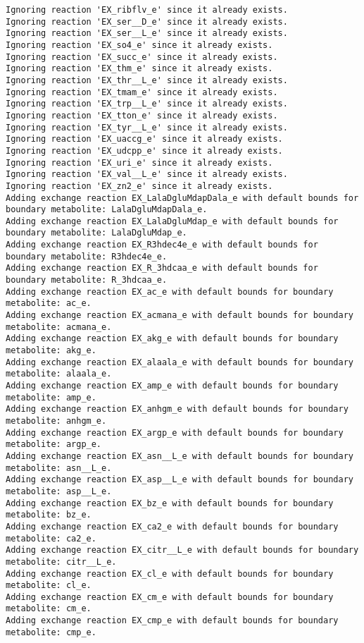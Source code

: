 \documentclass[
  letterpaper,
  DIV=11,
  numbers=noendperiod]{scrartcl}
\begin{document}
\begin{verbatim}
Ignoring reaction 'EX_ribflv_e' since it already exists.
Ignoring reaction 'EX_ser__D_e' since it already exists.
Ignoring reaction 'EX_ser__L_e' since it already exists.
Ignoring reaction 'EX_so4_e' since it already exists.
Ignoring reaction 'EX_succ_e' since it already exists.
Ignoring reaction 'EX_thm_e' since it already exists.
Ignoring reaction 'EX_thr__L_e' since it already exists.
Ignoring reaction 'EX_tmam_e' since it already exists.
Ignoring reaction 'EX_trp__L_e' since it already exists.
Ignoring reaction 'EX_tton_e' since it already exists.
Ignoring reaction 'EX_tyr__L_e' since it already exists.
Ignoring reaction 'EX_uaccg_e' since it already exists.
Ignoring reaction 'EX_udcpp_e' since it already exists.
Ignoring reaction 'EX_uri_e' since it already exists.
Ignoring reaction 'EX_val__L_e' since it already exists.
Ignoring reaction 'EX_zn2_e' since it already exists.
Adding exchange reaction EX_LalaDgluMdapDala_e with default bounds for boundary metabolite: LalaDgluMdapDala_e.
Adding exchange reaction EX_LalaDgluMdap_e with default bounds for boundary metabolite: LalaDgluMdap_e.
Adding exchange reaction EX_R3hdec4e_e with default bounds for boundary metabolite: R3hdec4e_e.
Adding exchange reaction EX_R_3hdcaa_e with default bounds for boundary metabolite: R_3hdcaa_e.
Adding exchange reaction EX_ac_e with default bounds for boundary metabolite: ac_e.
Adding exchange reaction EX_acmana_e with default bounds for boundary metabolite: acmana_e.
Adding exchange reaction EX_akg_e with default bounds for boundary metabolite: akg_e.
Adding exchange reaction EX_alaala_e with default bounds for boundary metabolite: alaala_e.
Adding exchange reaction EX_amp_e with default bounds for boundary metabolite: amp_e.
Adding exchange reaction EX_anhgm_e with default bounds for boundary metabolite: anhgm_e.
Adding exchange reaction EX_argp_e with default bounds for boundary metabolite: argp_e.
Adding exchange reaction EX_asn__L_e with default bounds for boundary metabolite: asn__L_e.
Adding exchange reaction EX_asp__L_e with default bounds for boundary metabolite: asp__L_e.
Adding exchange reaction EX_bz_e with default bounds for boundary metabolite: bz_e.
Adding exchange reaction EX_ca2_e with default bounds for boundary metabolite: ca2_e.
Adding exchange reaction EX_citr__L_e with default bounds for boundary metabolite: citr__L_e.
Adding exchange reaction EX_cl_e with default bounds for boundary metabolite: cl_e.
Adding exchange reaction EX_cm_e with default bounds for boundary metabolite: cm_e.
Adding exchange reaction EX_cmp_e with default bounds for boundary metabolite: cmp_e.

\end{verbatim}
\end{document}
